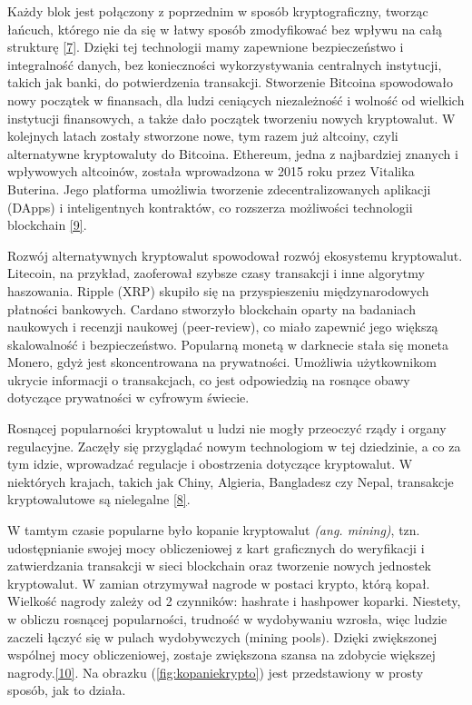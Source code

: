 \documentclass[12pt,a4paper,twoside, inzynierska]{pwr_wmat_praca_dyplomowa}
\theoremstyle{plain}
\numberwithin{theorem}{chapter}
\theoremstyle{definition}
\numberwithin{theorem}{chapter}
\begin{document}
	Każdy blok jest połączony z poprzednim w sposób kryptograficzny, tworząc łańcuch, którego nie da się w łatwy sposób zmodyfikować bez wpływu na całą strukturę \hyperref[info7]{[7]}. Dzięki tej technologii mamy zapewnione bezpieczeństwo i integralność danych, bez konieczności wykorzystywania centralnych instytucji, takich jak banki, do potwierdzenia transakcji.\newline
	Stworzenie Bitcoina spowodowało nowy początek w finansach, dla ludzi ceniących niezależność i wolność od wielkich instytucji finansowych, a także dało początek tworzeniu nowych kryptowalut. W kolejnych latach zostały stworzone nowe, tym razem już altcoiny, czyli alternatywne kryptowaluty do Bitcoina. Ethereum, jedna z najbardziej znanych i wpływowych altcoinów, została wprowadzona w 2015 roku przez Vitalika Buterina. Jego platforma umożliwia tworzenie zdecentralizowanych aplikacji (DApps) i inteligentnych kontraktów, co rozszerza możliwości technologii blockchain \hyperref[info9]{[9]}.\par
	Rozwój alternatywnych kryptowalut spowodował rozwój ekosystemu kryptowalut. Litecoin, na przykład, zaoferował szybsze czasy transakcji i inne algorytmy haszowania. Ripple (XRP) skupiło się na przyspieszeniu międzynarodowych płatności bankowych. Cardano stworzyło blockchain oparty na badaniach naukowych i recenzji naukowej (peer-review), co miało zapewnić jego większą skalowalność i bezpieczeństwo. Popularną monetą w darknecie stała się moneta Monero, gdyż jest skoncentrowana na prywatności. Umożliwia użytkownikom ukrycie informacji o transakcjach, co jest odpowiedzią na rosnące obawy dotyczące prywatności w cyfrowym świecie.\par
	Rosnącej popularności kryptowalut u ludzi nie mogły przeoczyć rządy i organy regulacyjne. Zaczęły się przyglądać nowym technologiom w tej dziedzinie, a co za tym idzie, wprowadzać regulacje i obostrzenia dotyczące kryptowalut. W niektórych krajach, takich jak Chiny, Algieria, Bangladesz czy Nepal, transakcje kryptowalutowe są nielegalne \hyperref[info8]{[8]}.\par
	W tamtym czasie popularne było kopanie kryptowalut \textit{(ang. mining)}, tzn. udostępnianie swojej mocy obliczeniowej z kart graficznych do weryfikacji i zatwierdzania transakcji w sieci blockchain oraz tworzenie nowych jednostek kryptowalut. W zamian otrzymywał nagrode w postaci krypto, którą kopał. Wielkość nagrody zależy od 2 czynników: hashrate i hashpower koparki. Niestety, w obliczu rosnącej popularności, trudność w wydobywaniu wzrosła, więc ludzie zaczeli łączyć się w pulach wydobywczych (mining pools). Dzięki zwiększonej wspólnej mocy obliczeniowej, zostaje zwiększona szansa na zdobycie większej nagrody.\hyperref[info10]{[10]}. Na obrazku (\ref{fig:kopaniekrypto}) jest przedstawiony w prosty sposób, jak to działa.\par
\end{document}
